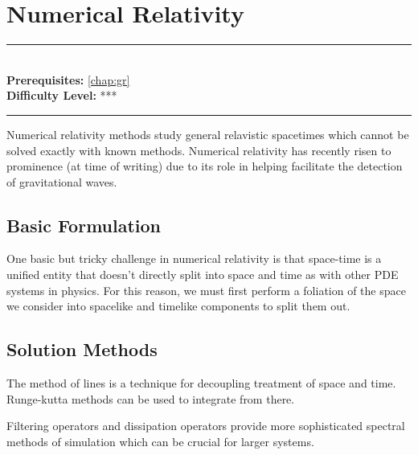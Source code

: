 \documentclass[book.tex]{subfiles}
\begin{document}
\chapter{Numerical Relativity}
\label{chap:numerical_relativity}
\noindent\rule{11cm}{0.4pt} \\
\textbf{Prerequisites:} \autoref{chap:gr}  \\
\textbf{Difficulty Level:} *** \\
\noindent\rule{11cm}{0.4pt}
\vspace{5mm}

Numerical relativity methods study general relavistic spacetimes which cannot be solved exactly with known methods. Numerical relativity has recently risen to prominence (at time of writing) due to its role in helping facilitate the detection of gravitational waves.

\section{Basic Formulation}
One basic but tricky challenge in numerical relativity is that space-time is a unified entity that doesn't directly split into space and time as with other PDE systems in physics. For this reason, we must first perform a foliation of the space we consider into spacelike and timelike components to split them out.
\section{Solution Methods}

The method of lines is a technique for decoupling treatment of space and time. Runge-kutta methods can be used to integrate from there.

Filtering operators and dissipation operators provide more sophisticated spectral methods of simulation which can be crucial for larger systems.
\end{document}
